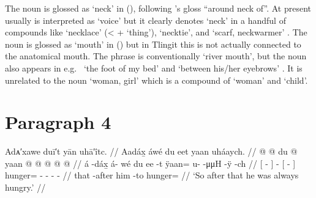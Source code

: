 The noun  is glossed as ‘neck’ in (\lastx), following \citeauthor{swanton:1909}’s gloss “around neck of”.
At present  usually is interpreted as ‘voice’ but it clearly denotes ‘neck’ in a handful of compounds like  ‘necklace’ (<  +  ‘thing’),  ‘necktie’, and  ‘scarf, neckwarmer’ \parencite[09/45]{leer:1973}.
The noun  is glossed as ‘mouth’ in (\lastx) but in Tlingit this is not actually connected to the anatomical mouth.
The phrase  is conventionally ‘river mouth’, but the noun  also appears in e.g.\  ‘the foot of my bed’ and  ‘between his/her eyebrows’ \parencite[03/253]{leer:1973}.
It is unrelated to the noun  ‘woman, girl’ which is a compound of  ‘woman’ and  ‘child’.

\section{Paragraph 4}\label{sec:100-para-4}

\ex\label{ex:100-48-always-hungry}%
%
\begingl
	\glpreamble	Adᴀ′xawe duī′t yān uhā′îtc. //
	\glpreamble	Aadáx̱ áwé du eet yaan uháaych. //
	\gla	{}  @ {} {}  @ {}
		{} du  @ {} {}
		yaan @  @ {} @ {} @ {} @ {} //
	\glb	{} á -dáx̱ {} á- wé
		{} du ee -t {}
		ÿaan= u-  -μμH -ÿ -ch //
	\glc	{}[  - {}]  -
		{}[   - {}]
		hunger= -  - - - //
	\gld	{} that -after {}  {}
		{} him {} -to {}
		hunger=  {} {} {} {} //
	\glft	‘So after that he was always hungry.’
		//
\endgl
\xe

